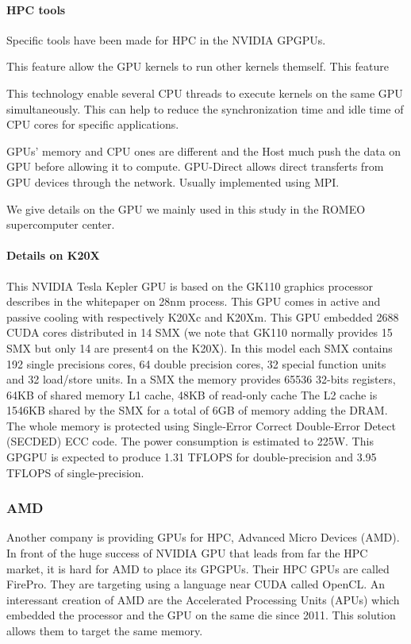 \paragraph{HPC tools}
Specific tools have been made for HPC in the NVIDIA GPGPUs. 
\begin{description}
	\item[Dynamic Parallelism] This feature allow the GPU kernels to run other kernels themself. This feature 
	\item[Hyper-Q] This technology enable several CPU threads to execute kernels on the same GPU simultaneously. This can help to reduce the synchronization time and idle time of CPU cores for specific applications.
	\item[NVIDIA GPU-Direct] GPUs' memory and CPU ones are different and the Host much push the data on GPU before allowing it to compute. GPU-Direct allows direct transferts from GPU devices through the network. Usually implemented using MPI.  
\end{description}

We give details on the GPU we mainly used in this study in the ROMEO supercomputer center. 

\paragraph{Details on K20X}
This NVIDIA Tesla Kepler GPU is based on the GK110 graphics processor describes in the whitepaper\cite{nvidia2012nvidias} on 28nm process.
This GPU comes in active and passive cooling with respectively K20Xc and K20Xm.
This GPU embedded 2688 CUDA cores distributed in 14 SMX (we note that GK110 normally provides 15 SMX but only 14 are present4 on the K20X).
In this model each SMX contains 192 single precisions cores, 64 double precision cores, 32 special function units and 32 load/store units.
In a SMX the memory provides 65536 32-bits registers, 64KB of shared memory L1 cache, 48KB of read-only cache
The L2 cache is 1546KB shared by the SMX for a total of 6GB of memory adding the DRAM.
The whole memory is protected using Single‐Error Correct Double‐Error Detect (SECDED) ECC code.
The power consumption is estimated to 225W.
This GPGPU is expected to produce 1.31 TFLOPS for double-precision and 3.95 TFLOPS of single-precision.

\subsubsection{AMD}
Another company is providing GPUs for HPC, Advanced Micro Devices (AMD). 
In front of the huge success of NVIDIA GPU that leads from far the HPC market, it is hard for AMD to place its GPGPUs. 
Their HPC GPUs are called FirePro.
They are targeting using a language near CUDA called OpenCL. 
An interessant creation of AMD are the Accelerated Processing Units (APUs) which embedded the processor and the GPU on the same die since 2011. 
This solution allows them to target the same memory. 

